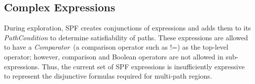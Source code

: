 \subsection{Complex Expressions}
During exploration, SPF creates conjunctions of expressions and adds them to its {\em PathCondition} to determine satisfiability of paths.
%
These expressions are allowed to have a \textit{Comparator}~(a comparison operator such as !=) as the top-level operator; however, comparison and Boolean operators are not allowed in sub-expressions.  Thus, the current set of SPF expressions is insufficiently expressive to represent the disjunctive formulas required for multi-path regions.%
%
%
%
